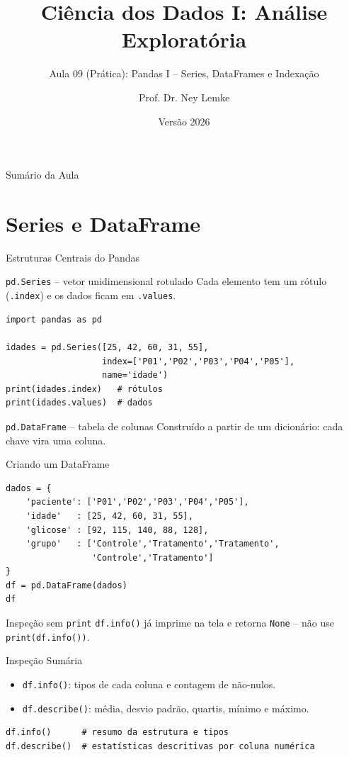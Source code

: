\documentclass[aspectratio=169, 10pt]{beamer}
\title[Aula 09 - Prática Pandas I]{Ciência dos Dados I: Análise Exploratória}
\subtitle{Aula 09 (Prática): Pandas I -- Series, DataFrames e Indexação}
\author{Prof. Dr. Ney Lemke}
\institute{UNESP -- Instituto de Biociências de Botucatu}
\date{Versão 2026}
\begin{document}
\frame{\titlepage}

\begin{frame}{Sumário da Aula}
  \tableofcontents
\end{frame}

\section{Series e DataFrame}

\begin{frame}[fragile]{Estruturas Centrais do Pandas}
  \begin{block}{\texttt{pd.Series} -- vetor unidimensional rotulado}
    Cada elemento tem um rótulo (\texttt{.index}) e os dados ficam em \texttt{.values}.
  \end{block}
  \begin{lstlisting}
import pandas as pd

idades = pd.Series([25, 42, 60, 31, 55],
                   index=['P01','P02','P03','P04','P05'],
                   name='idade')
print(idades.index)   # rótulos
print(idades.values)  # dados
  \end{lstlisting}
  \begin{block}{\texttt{pd.DataFrame} -- tabela de colunas}
    Construído a partir de um dicionário: cada chave vira uma coluna.
  \end{block}
\end{frame}

\begin{frame}[fragile]{Criando um DataFrame}
  \begin{lstlisting}
dados = {
    'paciente': ['P01','P02','P03','P04','P05'],
    'idade'   : [25, 42, 60, 31, 55],
    'glicose' : [92, 115, 140, 88, 128],
    'grupo'   : ['Controle','Tratamento','Tratamento',
                 'Controle','Tratamento']
}
df = pd.DataFrame(dados)
df
  \end{lstlisting}
  \begin{alertblock}{Inspeção sem \texttt{print}}
    \texttt{df.info()} já imprime na tela e retorna \texttt{None} -- não use \texttt{print(df.info())}.
  \end{alertblock}
\end{frame}

\begin{frame}[fragile]{Inspeção Sumária}
  \begin{itemize}
    \item \texttt{df.info()}: tipos de cada coluna e contagem de não-nulos.
    \item \texttt{df.describe()}: média, desvio padrão, quartis, mínimo e máximo.
  \end{itemize}
  \begin{lstlisting}
df.info()      # resumo da estrutura e tipos
df.describe()  # estatísticas descritivas por coluna numérica
  \end{lstlisting}
\end{frame}
\end{document}
